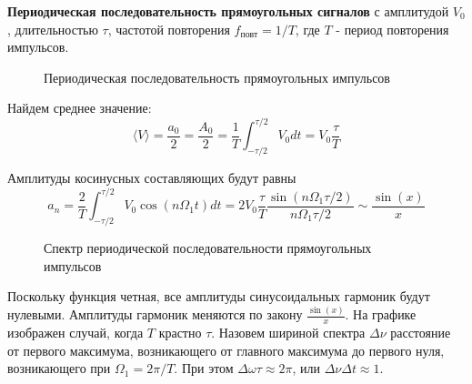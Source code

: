 \documentclass[14pt]{article}
\begin{document}
\vspace{1cm}
\textbf{Периодическая последовательность прямоугольных сигналов} с амплитудой $V_0$, длительностью $\tau$, частотой повторения $f_{\text{повт}} = 1/T$, где $T$ - период повторения импульсов. 

\begin{figure}[h!]
	\caption{Периодическая последовательность прямоугольных импульсов}
	\label{fig:image}
\end{figure}

Найдем среднее значение:
$$
	\langle V\rangle = \frac{a_0}{2} = \frac{A_0}{2} = \frac{1}{T}\int_{-\tau/2}^{\tau/2}V_0dt = V_0\frac{\tau}{T}
$$

Амплитуды косинусных составляющих будут равны
$$
	a_n = \frac{2}{T}\int_{-\tau/2}^{\tau/2}V_0\cos(n\Omega_1t)dt = 2V_0\frac{\tau}{T}\frac{\sin(n\Omega_1\tau/2)}{n\Omega_1\tau/2} \sim \frac{\sin(x)}{x}
$$

\begin{figure}[h!]
	\caption{Спектр периодической последовательности прямоугольных импульсов}
	\label{fig:image}
\end{figure}

Поскольку функция четная, все амплитуды синусоидальных гармоник будут нулевыми. Амплитуды гармоник меняются по закону $\frac{\sin(x)}{x}$. На графике изображен случай, когда $T$ крастно $\tau$. Назовем шириной спектра $\Delta\nu$ расстояние от первого максимума, возникающего от главного максимума до первого нуля, возникающего при 
$\Omega_1 = 2\pi/T$. При этом $\Delta\omega\tau \approx 2\pi$, или $\Delta\nu\Delta t \approx 1$.
\end{document}
